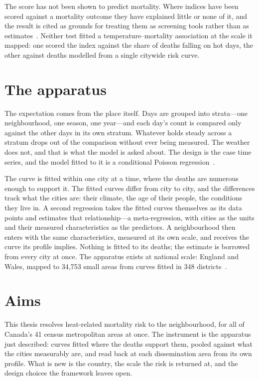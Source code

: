 The score has not been shown to predict mortality. Where indices have been
scored against a mortality outcome they have explained little or none of
it, and the result is cited as grounds for treating them as screening
tools rather than as estimates~\citep{conlon2020hvipca,mallen2019dallas}.
Neither test fitted a temperature--mortality association at the scale it
mapped: one scored the index against the share of deaths falling on hot
days, the other against deaths modelled from a single citywide risk curve.

\section{The apparatus}

The expectation comes from the place itself. Days are grouped into
strata---one neighbourhood, one season, one year---and each day's count is
compared only against the other days in its own stratum. Whatever holds
steady across a stratum drops out of the comparison without ever being
measured. The weather does not, and that is what the model is asked about.
The design is the case time series, and the model fitted to it is a
conditional Poisson regression~\citep{gasparrini2021,armstrong2014}.

The curve is fitted within one city at a time, where the deaths are
numerous enough to support it. The fitted curves differ from city to
city, and the differences track what the cities are: their climate,
the age of their people, the conditions they live in. A second
regression takes the fitted curves themselves as its data points and
estimates that relationship---a meta-regression, with cities as the
units and their measured characteristics as the predictors. A
neighbourhood then enters with the same characteristics, measured at
its own scale, and receives the curve its profile implies. Nothing is
fitted to its deaths; the estimate is borrowed from every city at
once. The apparatus exists at national scale: England and Wales,
mapped to 34{,}753 small areas from curves fitted in 348
districts~\citep{gasparrini2022smallarea}.

\section{Aims}

This thesis resolves heat-related mortality risk to the neighbourhood,
for all of Canada's 41 census metropolitan areas at once. The
instrument is the apparatus just described: curves fitted where the
deaths support them, pooled against what the cities measurably are, and
read back at each dissemination area from its own profile. What is new
is the country, the scale the risk is returned at, and the design
choices the framework leaves open.

